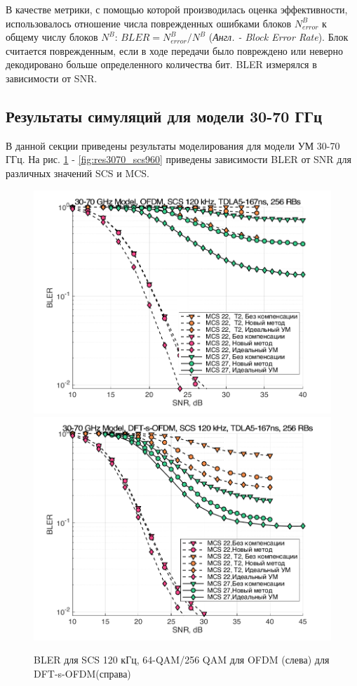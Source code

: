 В качестве метрики, с помощью которой производилась оценка эффективности,
использовалось отношение числа поврежденных ошибками блоков $N^B_{error}$ к общему числу
блоков $N^B$: $BLER = N^B_{error} / N^B$ (\textit{Англ. - Block Error
Rate}). Блок считается поврежденным, если в ходе передачи было повреждено
или неверно декодировано больше определенного количества бит. BLER измерялся
в зависимости от SNR.

\subsection{Результаты симуляций для модели 30-70 ГГц}
В данной секции приведены результаты моделирования для модели УМ 30-70 ГГц. 
На рис. \ref{fig:res3070_scs120} - \ref{fig:res3070_scs960} приведены
зависимости BLER от SNR для различных значений SCS и MCS.
\begin{figure}[h!]
    \centering
    \includegraphics[width=0.49\linewidth]{figs/res/ofdm/OFDM_Nokia_SCS120_MCS22_27.png}
    \includegraphics[width=0.49\linewidth]{figs/res/dftsofdm/DFT-s-OFDM_Nokia_SCS120_MCS22_27.png}
    \caption{BLER для SCS 120 кГц, 64-QAM/256 QAM для OFDM (слева) для DFT-s-OFDM(справа)}
    \label{fig:res3070_scs120}
\end{figure}

